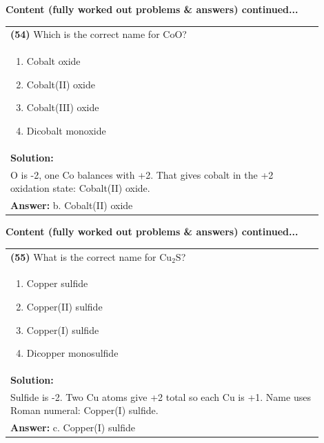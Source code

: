 \documentclass{article}
\begin{document}
{\newpage
\noindent
{\large\textbf{Content (fully worked out problems \& answers) continued...}}\\[0.2em]

\begin{tabular}{|p{0.9\linewidth}|}
\hline
\vspace{0.2cm}
\textbf{(54)} Which is the correct name for $\text{CoO}$? \\
\begin{minipage}[t]{0.85\linewidth}
\begin{enumerate}[label=\alph*.]
\item Cobalt oxide \
\item Cobalt(II) oxide \
\item Cobalt(III) oxide \
\item Dicobalt monoxide
\end{enumerate}
\end{minipage}\\
\hline
\vspace{0.2cm}
\textbf{Solution:} \\
O is -2, one Co balances with +2. That gives cobalt in the +2 oxidation state: Cobalt(II) oxide. \\
\hline
\vspace{0.2cm}
\textbf{Answer:} b. Cobalt(II) oxide \
\hline
\end{tabular}

\newpage
\noindent
{\large\textbf{Content (fully worked out problems \& answers) continued...}}\\[0.2em]

\begin{tabular}{|p{0.9\linewidth}|}
\hline
\vspace{0.2cm}
\textbf{(55)} What is the correct name for $\text{Cu}_2\text{S}$? \\
\begin{minipage}[t]{0.85\linewidth}
\begin{enumerate}[label=\alph*.]
\item Copper sulfide \
\item Copper(II) sulfide \
\item Copper(I) sulfide \
\item Dicopper monosulfide
\end{enumerate}
\end{minipage}\\
\hline
\vspace{0.2cm}
\textbf{Solution:} \\
Sulfide is -2. Two Cu atoms give +2 total so each Cu is +1. Name uses Roman numeral: Copper(I) sulfide. \\
\hline
\vspace{0.2cm}
\textbf{Answer:} c. Copper(I) sulfide \
\hline
\end{tabular}

}
\end{document}
